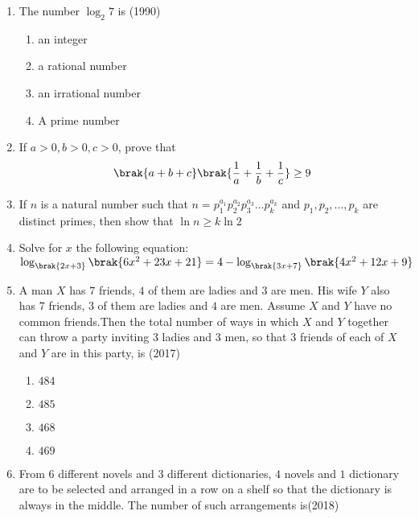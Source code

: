 \begin{enumerate}[label=\thesubsection.\arabic*,ref=\thesubsection.\theenumi]
\item The number ${\log_2}7$ is \hfill(1990)
    \begin{multicols}{2}
\begin{enumerate}    
        \item an integer
        \item a rational number
        \item an irrational number
        \item A prime number
    \end{enumerate}
\end{multicols}
    \item If $a>0, b>0, c>0$,  prove that
    \hfill{}
    $$\brak{a+b+c}\brak{\frac{1}{a}+\frac{1}{b}+\frac{1}{c}}\geq9$$
%
    \item If $n$ is a natural number such that
$n= p_{1}^{a_1}p_{2}^{a_2}p_{3}^{a_3}\dots p_{k}^{a_k} $ and $ p_{1}, p_{2}, \dots, p_{k} $ are distinct primes,  then show that $ \ln n \geq k \ln 2 $                              
		\hfill {}              
%
     \item Solve for $x$ the following equation:     
%     
	     \hfill {}          \\              
		     $   \log_{\brak{2x+3}}{\brak{6x^{2}+23x+21}}=4-\log_{\brak{3x+7}}{\brak{4x^{2}+12x+9}} $
	 \item A man $X$ has $7$ friends,  $4$ of them are ladies and $3$ are men. His wife $Y$ also has $7$ friends,  $3$ of them are ladies and $4$ are men. Assume $X$ and $Y$ have no common friends.Then the total number of ways in which $X$ and $Y$ together can throw a party inviting $3$ ladies and $3$ men,  so that $3$ friends of each of $X$ and $Y$ are in this party,  is \hfill{(2017)}
\begin{multicols}{4}
\begin{enumerate}    
\item $484$ 
\item $485$
\item $468$
\item $469$
\end{enumerate}
\end{multicols}
%
	\item From $6$ different novels and $3$ different dictionaries, $4$ novels and $1$ dictionary are to be selected and arranged in a row on a shelf so that  the dictionary is always in the middle. The number of such arrangements is\hfill{(2018)}

\end{enumerate}
